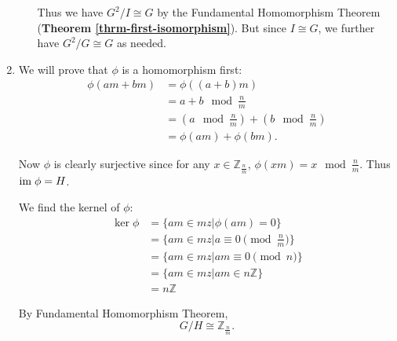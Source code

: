 \begin{enumerate}
\begin{enumerate}[label=(\roman*)]
        Thus we have $G^2 / I \cong G$ by the Fundamental Homomorphism Theorem (\textbf{Theorem \ref{thrm-first-isomorphism}}). But since $I \cong G$, we further have $G^2/G \cong G$ as needed.
    \end{enumerate}

    \item We will prove that $\phi$ is a homomorphism first:
    \begin{align*}
        \phi(am + bm) &= \phi((a+b)m)\\
        &= a+b \mod \frac nm\\
        &= (a \mod \frac nm) + (b \mod \frac nm)\\
        &= \phi(am) + \phi(bm).
    \end{align*}

    Now $\phi$ is clearly surjective since for any $x \in \mathbb{Z}_{\frac nm}$, $\phi(xm) = x \mod \frac nm$. Thus $\mathrm{im}\;\phi = H$.

    We find the kernel of $\phi$:
    \begin{align*}
        \ker\phi &= \{am \in mz \vert \phi(am) = 0\}\\
        &= \{am \in mz \vert a \equiv 0 \pmod{\frac nm}\}\\
        &= \{am \in mz \vert am \equiv 0 \pmod{n}\}\\
        &= \{am \in mz \vert am \in n\mathbb{Z}\}\\
        &= n\mathbb{Z}
    \end{align*}

    By Fundamental Homomorphism Theorem,
    \[
        G/H \cong \mathbb{Z}_{\frac nm}.
    \]
\end{enumerate}


